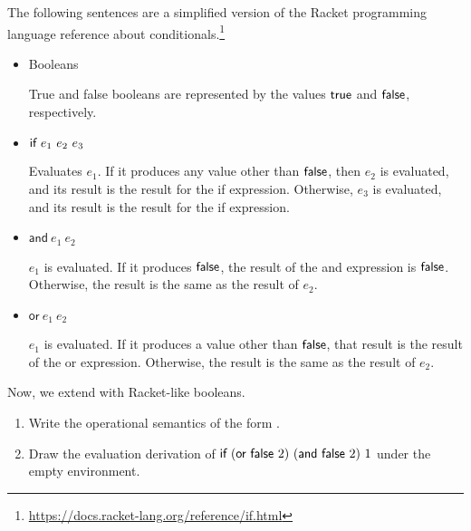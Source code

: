 \begin{exercise}

  The following sentences are a simplified version of the Racket programming
  language reference about
  conditionals.\footnote{\url{https://docs.racket-lang.org/reference/if.html}}

\newcommand{\eand}[2]{\textsf{and}\ #1\ #2}
\newcommand{\eor}[2]{\textsf{or}\ #1\ #2}

\begin{itemize}
  \item Booleans

    True and false booleans are represented by the values $\textsf{true}$ and
    $\textsf{false}$, respectively.

  \item $\textsf{if}\ e_1\ e_2\ e_3$

    Evaluates $e_1$. If it produces any value other than $\textsf{false}$, then $e_2$ is
    evaluated, and its result is the result for the \textsf{if} expression.
    Otherwise, $e_3$ is evaluated, and its result is the result for the
    \textsf{if} expression.

  \item $\eand{e_1}{e_2}$

    $e_1$ is evaluated. If it produces $\textsf{false}$, the result of the \textsf{and}
    expression is $\textsf{false}$. Otherwise, the result is the same as the result of
    $e_2$.

  \item $\eor{e_1}{e_2}$

    $e_1$ is evaluated. If it produces a value other than $\textsf{false}$, that result
    is the result of the \textsf{or} expression. Otherwise, the result is the
    same as the result of $e_2$.

\end{itemize}

Now, we extend \Lang with Racket-like booleans.

\begin{enumerate}
  \item
    Write the operational semantics of the form .
  \item
    Draw the evaluation derivation of
    $\eif{(\eor{\false}{2})}{(\eand{\false}{2})}{1}$
    under the empty environment.
\end{enumerate}

\end{exercise}

